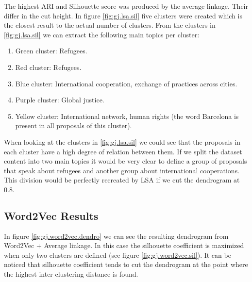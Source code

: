The highest ARI and Silhouette score was produced by the average linkage. Their differ in the cut height. In figure \ref{fig:gj.lsa.sil} five clusters were created which is the closest result to the actual number of clusters. From the clusters in \ref{fig:gj.lsa.sil} we can extract the following main topics per cluster:
\begin{enumerate}[itemsep=1pt,parsep=1pt]
\item Green cluster: Refugees.%
\item Red cluster: Refugees. 
\item Blue cluster: International cooperation, exchange of practices across cities.
\item Purple cluster: Global justice.
\item Yellow cluster: International network, human rights (the word Barcelona is present in all proposals of this cluster).
\end{enumerate}

When looking at the clusters in \ref{fig:gj.lsa.sil} we could see that the proposals in each cluster have a high degree of relation between them. If we split the dataset content into two main topics it would be very clear to define a group of proposals that speak about refugees and another group about international cooperations. This division would be perfectly recreated by LSA if we cut the dendrogram at 0.8.

\FloatBarrier
\subsection{Word2Vec Results}
In figure \ref{fig:gj.word2vec.dendro} we can see the resulting dendrogram from Word2Vec + Average linkage. In this case the silhouette coefficient is maximized when only two clusters are defined (see figure \ref{fig:gj.word2vec.sil}). It can be noticed that silhouette coefficient tends to cut the dendrogram at the point where the highest inter clustering distance is found. 

